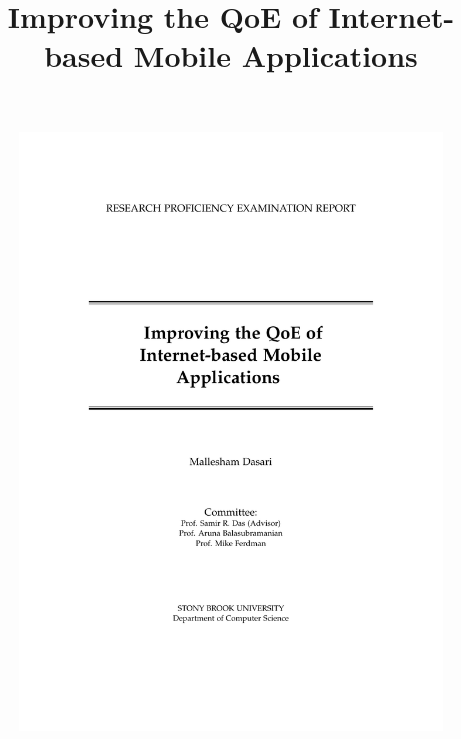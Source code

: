 \documentclass{sig-alternate}
\begin{document}
\begin{figure}[htp]
    \hspace*{-0.7in}  \includegraphics{frontpage.pdf}
\end{figure}

\title{Improving the QoE of Internet-based Mobile Applications}

\maketitle






















\balance

\end{document}
